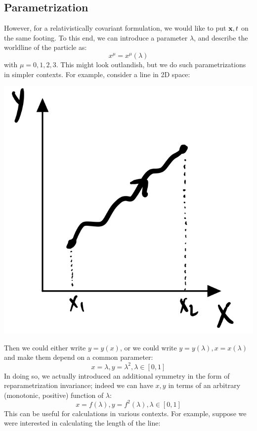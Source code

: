 \subsection{Parametrization}
However, for a relativistically covariant formulation, we would like to put $\mathbf{x}, t$ on the same footing. To this end, we can introduce a parameter $\lambda$, and describe the worldline of the particle as:
\begin{equation}
    x^\mu = x^\mu(\lambda)
\end{equation}
with $\mu = 0, 1, 2, 3$. This might look outlandish, but we do such parametrizations in simpler contexts. For example, consider a line in 2D space:

\begin{center}
    \includegraphics[scale=0.35]{Lectures/Images/lec3-yxpath.png}
\end{center}

Then we could either write $y = y(x)$, or we could write $y = y(\lambda), x = x(\lambda)$ and make them depend on a common parameter:
\begin{equation}
    x = \lambda, y = \lambda^2, \lambda \in [0, 1]
\end{equation}
In doing so, we actually introduced an additional symmetry in the form of reparametrization invariance; indeed we can have $x, y$ in terms of an arbitrary (monotonic, positive) function of $\lambda$:
\begin{equation}
    x= f(\lambda), y = f^2(\lambda), \lambda \in [0, 1]
\end{equation}
This can be useful for calculations in various contexts. For example, suppose we were interested in calculating the length of the line:

